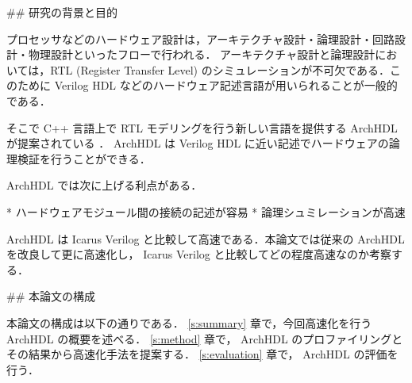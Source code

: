 ## 研究の背景と目的

プロセッサなどのハードウェア設計は，アーキテクチャ設計・論理設計・回路設計・物理設計といったフローで行われる．
アーキテクチャ設計と論理設計においては，RTL (Register Transfer Level)
のシミュレーションが不可欠である．このために
Verilog HDL などのハードウェア記述言語が用いられることが一般的である．

そこで C++ 言語上で RTL モデリングを行う新しい言語を提供する ArchHDL が提案されている \cite{satos:archhdl}．
ArchHDL は Verilog HDL に近い記述でハードウェアの論理検証を行うことができる．

ArchHDL では次に上げる利点がある．

* ハードウェアモジュール間の接続の記述が容易
* 論理シュミレーションが高速

ArchHDL は Icarus Verilog と比較して高速である．本論文では従来の
ArchHDL を改良して更に高速化し， Icarus Verilog と比較してどの程度高速なのか考察する．


## 本論文の構成

本論文の構成は以下の通りである． \ref{s:summary} 章で，今回高速化を行う ArchHDL の概要を述べる．
\ref{s:method} 章で， ArchHDL のプロファイリングとその結果から高速化手法を提案する．
\ref{s:evaluation} 章で， ArchHDL の評価を行う．


